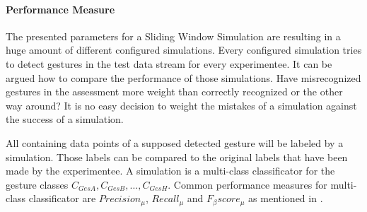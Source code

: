 \paragraph{Performance Measure} \label{performance_measure}
The presented parameters for a Sliding Window Simulation are resulting in a huge amount of different configured
simulations. Every configured simulation tries to detect gestures in the test data stream for every experimentee. It can
be argued how to compare the performance of those simulations. Have misrecognized gestures in the assessment more weight
than correctly recognized or the other way around? It is no easy decision to weight the mistakes of a simulation against
the success of a simulation.

All containing data points of a supposed detected gesture will be labeled by a simulation. Those labels can be compared
to the original labels that have been made by the experimentee. A simulation is a multi-class classificator for the
gesture classes $C_{GesA}, C_{GesB}, \dots, C_{GesH}$. Common performance measures for multi-class classificator are
$Precision_{\mu}$, $Recall_{\mu}$ and $F_{\beta}score_{\mu}$ as mentioned in \cite{sokolova2009systematic}.
